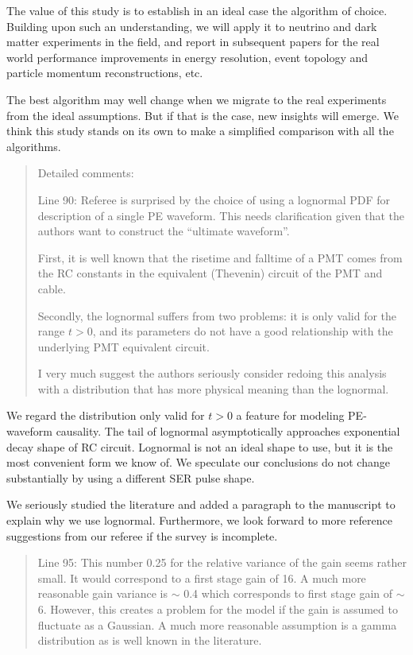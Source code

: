 \documentclass[12pt]{article}
\begin{document}
The value of this study is to establish in an ideal case the algorithm of choice.  Building upon such an understanding, we will apply it to neutrino and dark matter experiments in the field, and report in subsequent papers for the real world performance improvements in energy resolution, event topology and particle momentum reconstructions, etc.

The best algorithm may well change when we migrate to the real experiments from the ideal assumptions.  But if that is the case, new insights will emerge.  We think this study stands on its own to make a simplified comparison with all the algorithms.

\begin{quote}

Detailed comments:

Line 90: Referee is surprised by the choice of using a lognormal PDF for description of a single PE waveform. This needs clarification given that the authors want to construct the ``ultimate waveform''.

First, it is well known that the risetime and falltime of a PMT comes from the RC constants in the equivalent (Thevenin) circuit of the PMT and cable. 

Secondly, the lognormal suffers from two problems: it is only valid for the range $t>0$, and its parameters do not have a good relationship with the underlying PMT equivalent circuit.

I very much suggest the authors seriously consider redoing this analysis with a distribution that has more physical meaning than the lognormal. 
\end{quote}

We regard the distribution only valid for $t>0$ a feature for modeling PE-waveform causality.  The tail of lognormal asymptotically approaches exponential decay shape of RC circuit. Lognormal is not an ideal shape to use, but it is the most convenient form we know of.  We speculate our conclusions do not change substantially by using a different SER pulse shape.

We seriously studied the literature and added a paragraph to the manuscript to explain why we use lognormal.  Furthermore, we look forward to more reference suggestions from our referee if the survey is incomplete.

\begin{quote}
Line 95: This number 0.25 for the relative variance of the gain seems rather small. It would correspond to a first stage gain of 16. A much more reasonable gain variance is $\sim$ 0.4 which corresponds to first stage gain of $\sim$ 6. However, this creates a problem for the model if the gain is assumed to fluctuate as a Gaussian. A much more reasonable assumption is a gamma distribution as is well known in the literature.
\end{quote}
\end{document}
